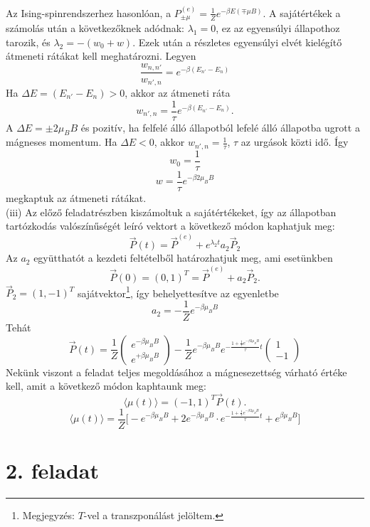 \documentclass[12pt]{article}
\begin{document}
Az Ising-spinrendszerhez hasonlóan, a  $P^{(e)}_{\pm\mu} = \frac{1}{Z}e^{-\beta E(\mp \mu B)}$. A sajátértékek a számolás után a következőknek adódnak: $\lambda_1 = 0$, ez az egyensúlyi állapothoz tarozik, és $\lambda_2 = -(w_0 + w)$. Ezek után a részletes egyensúlyi elvét kielégítő átmeneti rátákat kell meghatározni. Legyen 
$$\frac{w_{n, n'}}{w_{n', n}} = e^{-\beta(E_{n'}-E_{n})}  $$
Ha $\Delta E = (E_{n'}-E_{n})> 0$, akkor az átmeneti ráta
$$w_{n',n} =\frac{1}{\tau}e^{-\beta(E_{n'}-E_{n})} .$$
A $\Delta E = \pm 2\mu_B B$ és pozitív, ha felfelé álló állapotból lefelé álló állapotba ugrott a mágneses momentum. Ha $\Delta E < 0$, akkor $w_{n',n} = \frac{1}{\tau}$, $\tau$ az urgások közti idő. Így 
$$w_0 = \frac{1}{\tau}$$
$$w= \frac{1}{\tau}e^{-\beta 2 \mu_B B}$$
megkaptuk az átmeneti rátákat.\\
(iii) Az előző feladatrészben kiszámoltuk a sajátértékeket, így az állapotban tartózkodás valószínűségét leíró vektort a következő módon kaphatjuk meg:
$$\vec{P}(t) = \vec{P}^{(e)} + e^{\lambda_2 t} a_2 \vec{P}_2$$
Az $a_2$ együtthatót a kezdeti feltételből határozhatjuk meg, ami esetünkben
$$\vec{P}(0) = (0, 1)^T = \vec{P}^{(e)} + a_2\vec{P}_2.$$
$\vec{P}_2 = (1, -1)^T$ sajátvektor\footnote{Megjegyzés: $T$-vel a transzponálást jelöltem.}, így behelyettesítve az egyenletbe
$$a_2 = -\frac{1}{Z}e^{-\beta \mu_B B}$$
Tehát
\[
 \vec{P}(t) = \frac{1}{Z}
\begin{pmatrix}
e^{-\beta \mu_B B}\\
e^{+\beta \mu_B B}
\end{pmatrix}
-\frac{1}{Z}e^{-\beta \mu_B B} e^{-\frac{1+\frac{1}{\tau}e^{-\beta 2 \mu_B B}}{\tau}t}
\begin{pmatrix}
1\\
-1
\end{pmatrix}
\]
Nekünk viszont a feladat teljes megoldásához a mágnesezettség várható értéke kell, amit a következő módon kaphtaunk meg:
$$\langle \mu(t)\rangle = (-1, 1)^T \vec{P}(t).$$
$$\langle \mu(t)\rangle = \frac{1}{Z}\Big [ -e^{-\beta \mu_B B}+2e^{-\beta \mu_B B}\cdot  e^{-\frac{1+\frac{1}{\tau}e^{-\beta 2 \mu_B B}}{\tau}t} +e^{\beta \mu_B B} \Big ]$$








\newpage


\section*{2. feladat}
\end{document}
